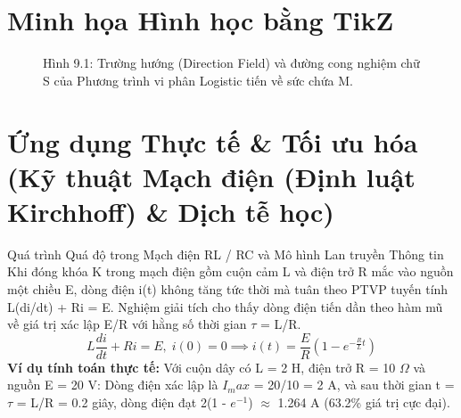 \documentclass[11pt,a4paper,oneside]{book}
\begin{document}
\section{Minh họa Hình học bằng TikZ}
\begin{figure}[htbp]
\centering
{}
\caption{Hình 9.1: Trường hướng (Direction Field) và đường cong nghiệm chữ S của Phương trình vi phân Logistic tiến về sức chứa M.}
\label{fig:tikz-ch9-logistic}
\end{figure}

\section{Ứng dụng Thực tế \& Tối ưu hóa (Kỹ thuật Mạch điện (Định luật Kirchhoff) \& Dịch tễ học)}
\begin{ungdung}{Quá trình Quá độ trong Mạch điện RL / RC và Mô hình Lan truyền Thông tin}
Khi đóng khóa K trong mạch điện gồm cuộn cảm L và điện trở R mắc vào nguồn một chiều E, dòng điện i(t) không tăng tức thời mà tuân theo PTVP tuyến tính L(di/dt) + Ri = E. Nghiệm giải tích cho thấy dòng điện tiến dần theo hàm mũ về giá trị xác lập E/R với hằng số thời gian $\tau$  = L/R.
\[ L\frac{di}{dt} + R i = E, \; i(0) = 0 \implies i(t) = \frac{E}{R}\left(1 - e^{-\frac{R}{L}t}\right) \]
\noindent\textbf{Ví dụ tính toán thực tế:} Với cuộn dây có L = 2 H, điện trở R = 10 $\Omega$  và nguồn E = 20 V: Dòng điện xác lập là $I_max$ = 20/10 = 2 A, và sau thời gian t = $\tau$  = L/R = 0.2 giây, dòng điện đạt 2(1 - $e^{-1}$) $\approx$  1.264 A (63.2\% giá trị cực đại).
\end{ungdung}
\end{document}
